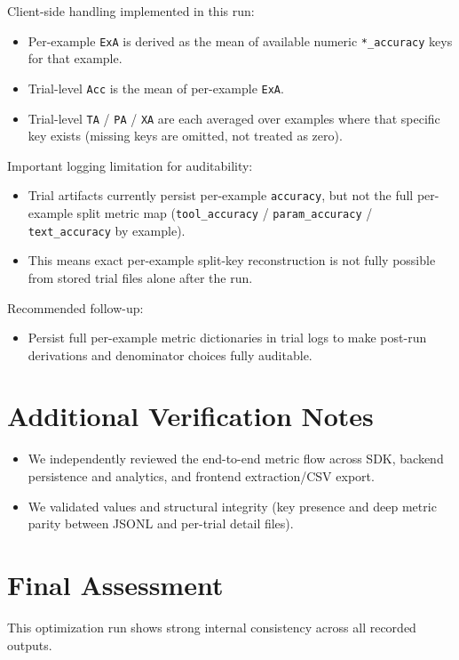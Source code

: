 \documentclass[11pt]{article}
\begin{document}
Client-side handling implemented in this run:
\begin{itemize}
    \item Per-example \texttt{ExA} is derived as the mean of available numeric \texttt{*\_accuracy} keys for that example.
    \item Trial-level \texttt{Acc} is the mean of per-example \texttt{ExA}.
    \item Trial-level \texttt{TA} / \texttt{PA} / \texttt{XA} are each averaged over examples where that specific key exists (missing keys are omitted, not treated as zero).
\end{itemize}

Important logging limitation for auditability:
\begin{itemize}
    \item Trial artifacts currently persist per-example \texttt{accuracy}, but not the full per-example split metric map (\texttt{tool\_accuracy} / \texttt{param\_accuracy} / \texttt{text\_accuracy} by example).
    \item This means exact per-example split-key reconstruction is not fully possible from stored trial files alone after the run.
\end{itemize}

Recommended follow-up:
\begin{itemize}
    \item Persist full per-example metric dictionaries in trial logs to make post-run derivations and denominator choices fully auditable.
\end{itemize}

\section{Additional Verification Notes}

\begin{itemize}
    \item We independently reviewed the end-to-end metric flow across SDK, backend persistence and analytics, and frontend extraction/CSV export.
    \item We validated values and structural integrity (key presence and deep metric parity between JSONL and per-trial detail files).
\end{itemize}

\section{Final Assessment}

This optimization run shows strong internal consistency across all recorded outputs.

\begin{center}
\end{center}
\end{document}
